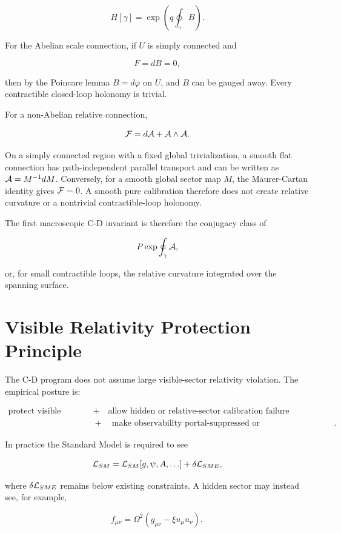 \documentclass[11pt]{article}
\begin{document}
\[
H[\gamma]=\exp\left(q\oint_\gamma B\right).
\]


For the Abelian scale connection, if \(U\) is simply connected and


\[
F=dB=0,
\]


then by the Poincare lemma \(B=d\varphi\) on \(U\), and \(B\) can be gauged away. Every contractible closed-loop holonomy is trivial.


For a non-Abelian relative connection,


\[
{\cal F}=d{\cal A}+{\cal A}\wedge{\cal A}.
\]


On a simply connected region with a fixed global trivialization, a smooth flat connection has path-independent parallel transport and can be written as \({\cal A}=M^{-1}dM\). Conversely, for a smooth global sector map \(M\), the Maurer-Cartan identity gives \({\cal F}=0\). A smooth pure calibration therefore does not create relative curvature or a nontrivial contractible-loop holonomy.


The first macroscopic C-D invariant is therefore the conjugacy class of


\[
P\exp\oint_\gamma {\cal A},
\]


or, for small contractible loops, the relative curvature integrated over the spanning surface.


\section{Visible Relativity Protection Principle}


The C-D program does not assume large visible-sector relativity violation. The empirical posture is:


\[
\begin{aligned}
\text{protect visible relativity}
&\quad+\quad
\text{allow hidden or relative-sector calibration failure}
\\
&\quad+\quad
\text{make observability portal-suppressed or topological/interface-limited}.
\end{aligned}
\]


In practice the Standard Model is required to see


\[
{\cal L}_{SM}={\cal L}_{SM}[g,\psi,A,\ldots]+\delta{\cal L}_{SME},
\]


where \(\delta{\cal L}_{SME}\) remains below existing constraints. A hidden sector may instead see, for example,


\[
f_{\mu\nu}=\Omega^2(g_{\mu\nu}-\xi u_\mu u_\nu),
\]
\end{document}
